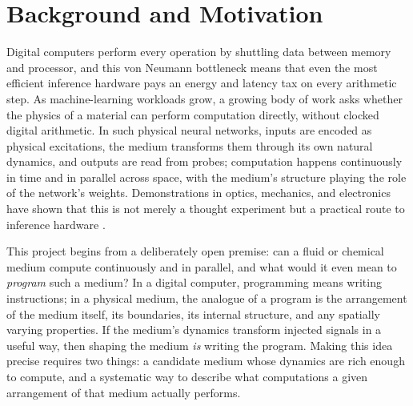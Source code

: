 
\section{Background and Motivation}
\label{sec:background}

Digital computers perform every operation by shuttling data between memory and processor, and this von Neumann bottleneck means that even the most efficient inference hardware pays an energy and latency tax on every arithmetic step. 
As machine-learning workloads grow, a growing body of work asks whether the physics of a material can perform computation directly, without clocked digital arithmetic. 
In such physical neural networks, inputs are encoded as physical excitations, the medium transforms them through its own natural dynamics, and outputs are read from probes; computation happens continuously in time and in parallel across space, with the medium's structure playing the role of the network's weights. 
Demonstrations in optics, mechanics, and electronics have shown that this is not merely a thought experiment but a practical route to inference hardware \cite{lin2018alloptical, wright2022deep, hughes2019wave}.

This project begins from a deliberately open premise: can a fluid or chemical medium compute continuously and in parallel, and what would it even mean to \emph{program} such a medium? 
In a digital computer, programming means writing instructions; in a physical medium, the analogue of a program is the arrangement of the medium itself, its boundaries, its internal structure, and any spatially varying properties. 
If the medium's dynamics transform injected signals in a useful way, then shaping the medium \emph{is} writing the program. 
Making this idea precise requires two things: a candidate medium whose dynamics are rich enough to compute, and a systematic way to describe what computations a given arrangement of that medium actually performs.

